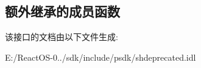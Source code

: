 \subsection*{额外继承的成员函数}


该接口的文档由以下文件生成\+:\begin{DoxyCompactItemize}
\item 
E\+:/\+React\+O\+S-\/0../sdk/include/psdk/shdeprecated.\+idl\end{DoxyCompactItemize}
